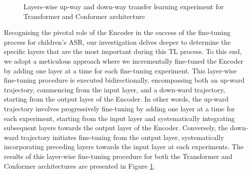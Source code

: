 \begin{figure}
    \centering
    \caption{Layers-wise up-way and down-way transfer learning experiment for Transformer and Conformer architecture}
    \label{fig:layerWISE}
\end{figure}

Recognising the pivotal role of the Encoder in the success of the fine-tuning process for children's \ac{ASR}, our investigation delves deeper to determine the specific layers that are the most important during this \ac{TL} process. To this end, we adopt a meticulous approach where we incrementally fine-tuned the Encoder by adding one layer at a time for each fine-tuning experiment. This layer-wise fine-tuning procedure is executed bidirectionally, encompassing both an up-ward trajectory, commencing from the input layer, and a down-ward trajectory, starting from the output layer of the Encoder. In other words, the up-ward trajectory involves progressively fine-tuning by adding one layer at a time for each experiment, starting from the input layer and systematically integrating subsequent layers towards the output layer of the Encoder. Conversely, the down-ward trajectory initiates fine-tuning from the output layer, systematically incorporating preceding layers towards the input layer at each experiments. The results of this layer-wise fine-tuning procedure for both the Transformer and Conformer architectures are presented in Figure \ref{fig:layerWISE}.

